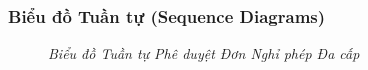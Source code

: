 \subsubsection{Biểu đồ Tuần tự (Sequence Diagrams)}

\begin{figure}[H]
    \centering
    \caption[\textit{Biểu đồ tuần tự phê duyệt đơn nghỉ phép đa cấp}]{\textit{Biểu đồ Tuần tự Phê duyệt Đơn Nghỉ phép Đa cấp}}
    \label{fig:seq_hrm_leave_app}
\end{figure}

